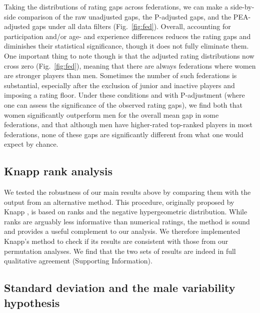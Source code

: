 \documentclass[9pt,twocolumn,twoside,lineno]{pnas-new}
\newcommand{\SI}{Supporting Information}
\begin{document}
Taking the distributions of rating gaps across federations, we can make a side-by-side comparison of the raw unadjusted gaps, the P-adjusted gaps, and the PEA-adjusted gaps under all data filters (Fig.~\ref{fig:fed}). Overall, accounting for participation and/or age- and experience differences reduces the rating gaps and diminishes their statistical significance, though it does not fully eliminate them. One important thing to note though is that the adjusted rating distributions now cross zero (Fig.~\ref{fig:fed}), meaning that there are always federations where women are stronger players than men. Sometimes the number of such federations is substantial, especially after the exclusion of junior and inactive players and imposing a rating floor. Under these conditions and with P-adjustment (where one can assess the significance of the observed rating gaps), we find both that women significantly outperform men for the overall mean gap in some federations, and that although men have higher-rated top-ranked players in most federations, none of these gaps are significantly different from what one would expect by chance.


\subsection*{Knapp rank analysis} 

We tested the robustness of our main results above by comparing them with the output from an alternative method. This procedure, originally proposed by Knapp \cite{knapp2010prsb}, is based on ranks and the negative hypergeometric distribution. While ranks are arguably less informative than numerical ratings, the method is sound and provides a useful complement to our analysis. We therefore implemented Knapp's method to check if its results are consistent with those from our permutation analyses. We find that the two sets of results are indeed in full qualitative agreement (\SI).


\subsection*{Standard deviation and the male variability hypothesis}
\end{document}
